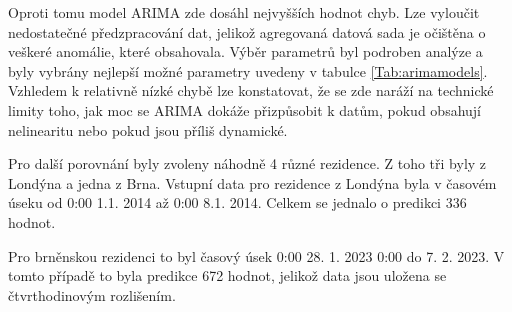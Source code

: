 \documentclass[FM,BP,fonts]{tulthesis}
\begin{document}
Oproti tomu model ARIMA zde dosáhl nejvyšších hodnot chyb. Lze vyloučit nedostatečné předzpracování dat, jelikož agregovaná datová sada je očištěna o veškeré anomálie, které obsahovala. Výběr parametrů byl podroben analýze a byly vybrány nejlepší možné parametry uvedeny v tabulce \ref{Tab:arimamodels}. Vzhledem k relativně nízké chybě lze konstatovat, že se zde naráží na technické limity toho, jak moc se ARIMA dokáže přizpůsobit k datům, pokud obsahují nelinearitu nebo pokud jsou příliš dynamické.


Pro další porovnání byly zvoleny náhodně 4 různé rezidence. Z toho tři byly z Londýna a jedna z Brna. Vstupní data pro rezidence z Londýna byla v časovém úseku od 0:00 1.1. 2014 až 0:00 8.1. 2014. Celkem se jednalo o predikci 336 hodnot. 

Pro brněnskou rezidenci to byl časový úsek 0:00 28. 1. 2023 0:00 do 7. 2. 2023. V tomto případě to byla predikce 672 hodnot, jelikož data jsou uložena se čtvrthodinovým rozlišením.
\end{document}
